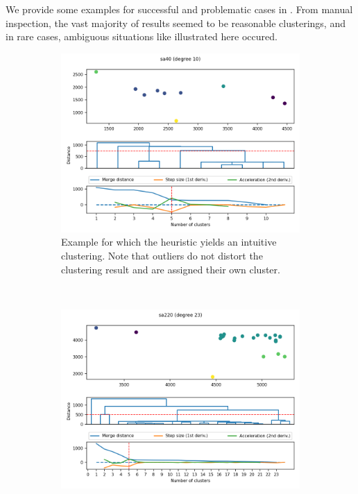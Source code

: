 \documentclass[
	fontsize=10pt, %
	twoside=false, %
	secnumdepth=1, %
  toc=indentunnumbered %
]{kaobook}
\begin{document}


We provide some examples for successful and problematic cases in
. From manual inspection, the vast majority of
results seemed to be reasonable clusterings, and in rare cases, ambiguous
situations like illustrated here occured.


\begin{figure}[h]
  \centering
  \begin{subfigure}{0.48\linewidth}
    \includegraphics[width=1.0\textwidth]{dendrograms/sa40.png}
    \caption{
      Example for which the heuristic yields an intuitive clustering. Note that
      outliers do not distort the clustering result and are assigned their own cluster.
    }
  \end{subfigure}
  ~~~
  \begin{subfigure}{0.48\linewidth}
    \includegraphics[width=\textwidth]{dendrograms/sa220.png}

\end{subfigure}
\end{figure}
\end{document}
